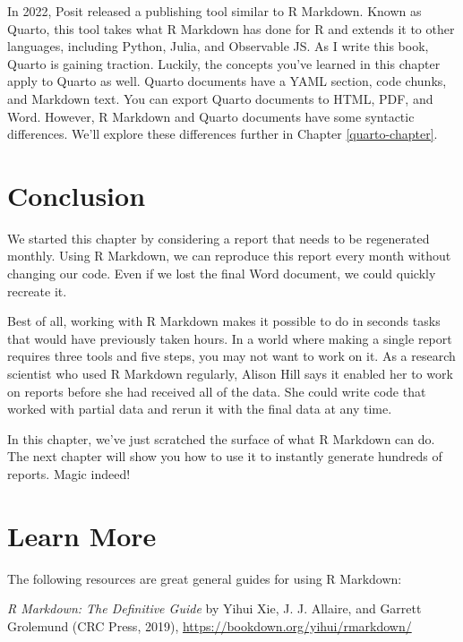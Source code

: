 \documentclass[
]{book}
\begin{document}
In 2022, Posit released a publishing tool similar to R Markdown. Known as Quarto, this tool takes what R Markdown has done for R and extends it to other languages, including Python, Julia, and Observable JS. As I write this book, Quarto is gaining traction. Luckily, the concepts you've learned in this chapter apply to Quarto as well. Quarto documents have a YAML section, code chunks, and Markdown text. You can export Quarto documents to HTML, PDF, and Word. However, R Markdown and Quarto documents have some syntactic differences. We'll explore these differences further in Chapter \ref{quarto-chapter}.

\hypertarget{conclusion-3}{%
\section*{Conclusion}\label{conclusion-3}}

We started this chapter by considering a report that needs to be regenerated monthly. Using R Markdown, we can reproduce this report every month without changing our code. Even if we lost the final Word document, we could quickly recreate it.

Best of all, working with R Markdown makes it possible to do in seconds tasks that would have previously taken hours. In a world where making a single report requires three tools and five steps, you may not want to work on it. As a research scientist who used R Markdown regularly, Alison Hill says it enabled her to work on reports before she had received all of the data. She could write code that worked with partial data and rerun it with the final data at any time.

In this chapter, we've just scratched the surface of what R Markdown can do. The next chapter will show you how to use it to instantly generate hundreds of reports. Magic indeed!

\hypertarget{learn-more-5}{%
\section*{Learn More}\label{learn-more-5}}

The following resources are great general guides for using R Markdown:

\emph{R Markdown: The Definitive Guide} by Yihui Xie, J. J. Allaire, and Garrett Grolemund (CRC Press, 2019), \url{https://bookdown.org/yihui/rmarkdown/}
\end{document}
